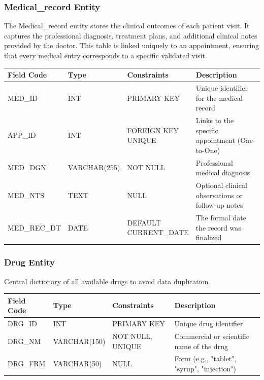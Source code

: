 \subsubsection{Medical\_record Entity}
The Medical\_record entity stores the clinical outcomes of each patient visit. It captures the professional diagnosis, treatment plans, and additional clinical notes provided by the doctor. This table is linked uniquely to an appointment, ensuring that every medical entry corresponds to a specific validated visit.

\begin{table}[H]
	\centering
	\small
	\renewcommand{\arraystretch}{1.4}
	\begin{tabularx}{\textwidth}{l l l X}
		\toprule
		\rowcolor[gray]{0.9} \textbf{Field Code} & \textbf{Type} & \textbf{Constraints} & \textbf{Description} \\
		\midrule
		MED\_ID & INT &  PRIMARY KEY & Unique identifier for the medical record \\
		APP\_ID & INT & \makecell[l]{FOREIGN KEY \\ UNIQUE}   & Links to the specific appointment (One-to-One) \\
		MED\_DGN & VARCHAR(255) & NOT NULL & Professional medical diagnosis \\
		MED\_NTS & TEXT & NULL & Optional clinical observations or follow-up notes \\
		MED\_REC\_DT & DATE & \makecell[l]{DEFAULT \\ CURRENT\_DATE} & The formal date the record was finalized \\
		\bottomrule
	\end{tabularx}
\end{table}
\subsubsection{Drug Entity}
Central dictionary of all available drugs to avoid data duplication.

\begin{table}[H]
	\centering
	\small
	\renewcommand{\arraystretch}{1.3}
	\begin{tabularx}{\textwidth}{l l l X}
		\toprule
		\rowcolor[gray]{0.9} \textbf{Field Code} & \textbf{Type} & \textbf{Constraints} & \textbf{Description} \\
		\midrule
		DRG\_ID       & INT           & PRIMARY KEY & Unique drug identifier \\
		DRG\_NM     & VARCHAR(150)  & NOT NULL, UNIQUE & Commercial or scientific name of the drug \\
		DRG\_FRM     & VARCHAR(50)   & NULL & Form (e.g., "tablet", "syrup", "injection") \\
		
		\bottomrule
	\end{tabularx}
\end{table}
